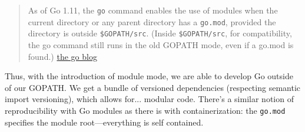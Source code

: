 \documentclass[11pt, twoside, reqno]{book}
\begin{document}
\begin{quote}
As of Go 1.11, the \texttt{go} command enables the use of modules when the current directory or any parent directory has a \texttt{go.mod}, provided the directory is outside \texttt{\$GOPATH/src}. (Inside \texttt{\$GOPATH/src}, for compatibility, the go command still runs in the old GOPATH mode, even if a go.mod is found.) \href{https://blog.golang.org/using-go-modules}{the go blog}
\end{quote}

Thus, with the introduction of module mode, we are able to develop Go outside of our GOPATH. We get a bundle of versioned dependencies (respecting semantic import versioning), which allows for... modular code. There's a similar notion of reproducibility with Go modules as there is with containerization: the \texttt{go.mod} specifies the module root—everything is self contained.
\end{document}
